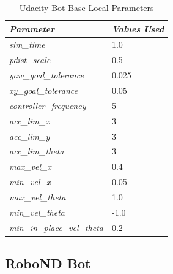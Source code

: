 \documentclass[10pt,journal,compsoc]{IEEEtran}
\begin{document}
\begin{table}[h]
\renewcommand{\arraystretch}{1.5}
\centering
\begin{tabular}{|l|l|}
\hline
\textit{\textbf{Parameter}}         & \textit{\textbf{Values Used}} \\ \hline
\textit{sim\_time}                  & 1.0                           \\ \hline
\textit{pdist\_scale}               & 0.5                           \\ \hline
\textit{yaw\_goal\_tolerance}       & 0.025                         \\ \hline
\textit{xy\_goal\_tolerance}        & 0.05                          \\ \hline
\textit{controller\_frequency}      & 5                             \\ \hline
\textit{acc\_lim\_x}                & 3                             \\ \hline
\textit{acc\_lim\_y}                & 3                             \\ \hline
\textit{acc\_lim\_theta}            & 3                             \\ \hline
\textit{max\_vel\_x}                & 0.4                           \\ \hline
\textit{min\_vel\_x}                & 0.05                          \\ \hline
\textit{max\_vel\_theta}            & 1.0                           \\ \hline
\textit{min\_vel\_theta}            & -1.0                          \\ \hline
\textit{min\_in\_place\_vel\_theta} & 0.2                           \\ \hline
\end{tabular}
\vspace{5pt}
\caption{Udacity Bot Base-Local Parameters}
\label{table:base-local-params-udacity-bot}
\end{table}


\subsection{RoboND Bot}
\end{document}

